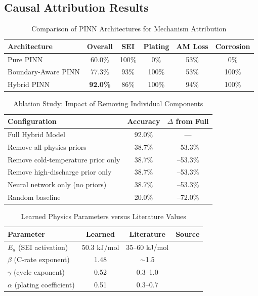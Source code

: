 \documentclass[5p,times,authoryear]{elsarticle}
\begin{document}
\subsection{Causal Attribution Results}
\begin{table}[!htb]
\caption{Comparison of PINN Architectures for Mechanism Attribution}
\begin{center}
\begin{tabular}{lccccc}
\toprule
\textbf{Architecture} & \textbf{Overall} & \textbf{SEI} & \textbf{Plating} & \textbf{AM Loss} & \textbf{Corrosion} \\
\midrule
Pure PINN & 60.0\% & 100\% & 0\% & 53\% & 0\% \\
Boundary-Aware PINN & 77.3\% & 93\% & 100\% & 53\% & 100\% \\
Hybrid PINN & \textbf{92.0\%} & 86\% & 100\% & 94\% & 100\% \\
\bottomrule
\end{tabular}
\end{center}
\label{tab:pinn_comparison}
\end{table}
\begin{table}[!htb]
\caption{Ablation Study: Impact of Removing Individual Components}
\begin{center}
\begin{tabular}{lcc}
\toprule
\textbf{Configuration} & \textbf{Accuracy} & \textbf{$\Delta$ from Full} \\
\midrule
Full Hybrid Model & 92.0\% & --- \\
Remove all physics priors & 38.7\% & --53.3\% \\
Remove cold-temperature prior only & 38.7\% & --53.3\% \\
Remove high-discharge prior only & 38.7\% & --53.3\% \\
Neural network only (no priors) & 38.7\% & --53.3\% \\
Random baseline & 20.0\% & --72.0\% \\
\bottomrule
\end{tabular}
\end{center}
\label{tab:ablation}
\end{table}
\begin{table}[!htb]
\caption{Learned Physics Parameters versus Literature Values}
\begin{center}
\begin{tabular}{lccc}
\toprule
\textbf{Parameter} & \textbf{Learned} & \textbf{Literature} & \textbf{Source} \\
\midrule
$E_a$ (SEI activation) & 50.3 kJ/mol & 35--60 kJ/mol & \citet{broussely2005main} \\
$\beta$ (C-rate exponent) & 1.48 & $\sim$1.5 & \citet{zhang2020degradation} \\
$\gamma$ (cycle exponent) & 0.52 & 0.3--1.0 & \citet{reniers2019review} \\
$\alpha$ (plating coefficient) & 0.51 & 0.3--0.7 & \citet{waldmann2014temperature} \\
\bottomrule
\end{tabular}
\end{center}
\label{tab:physics_params}
\end{table}
\end{document}
